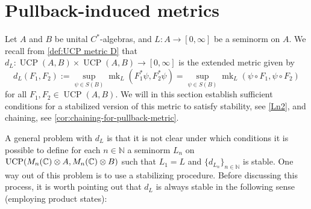\documentclass[11pt, a4paper, oneside, final, reqno]{amsart}
\newcommand{\bbN}{\mathbb{N}}
\newcommand{\bbC}{\mathbb{C}}
\newcommand{\UCP}{\operatorname{UCP}}
\newcommand{\mk}{\operatorname{mk}}
\theoremstyle{definition}
\theoremstyle{plain}
\theoremstyle{remark}
\numberwithin{equation}{section}
\begin{document}
\section{Pullback-induced metrics}\label{UCP}

Let $A$ and $B$ be unital $C^*$-algebras, and $L \colon A \to [0,\infty]$ be a seminorm on $A$. We recall from \cref{def:UCP metric D} that $d_L \colon \UCP(A,B) \times \UCP(A,B) \to [0,\infty]$ is the extended metric given by
\begin{equation*}
    d_L(F_1, F_2) := \sup\limits_{\psi \in S(B)}\mk_L(F_1^*\psi,F_2^*\psi) = \sup\limits_{\psi \in S(B)}\mk_L(\psi\circ F_1, \psi\circ F_2)
\end{equation*}
for all $F_1, F_2 \in \UCP(A,B)$. We will in this section establish sufficient conditions for a stabilized version of this metric to satisfy stability, see \cref{Ln2}, and chaining, see \cref{cor:chaining-for-pullback-metric}.

A general problem with $d_L$ is that it is not clear under which conditions it is possible to define for each $n\in \bbN$ a seminorm $L_n$ on ${\rm UCP}(M_n(\bbC)\otimes A, M_n(\bbC)\otimes B)$ such that $L_1= L$  and $\{d_{L_n}\}_{n\in \bbN}$ is stable. One way out of this problem is to use a stabilizing procedure. Before discussing this process, it is worth pointing out that $d_L$ is always stable in the following sense (employing product states):
\end{document}
